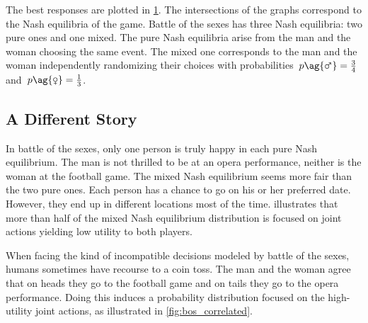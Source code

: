 The best responses are plotted in \cref{fig:bos_best_response}.
The intersections of the graphs correspond to the Nash equilibria of the game.
Battle of the sexes has three Nash equilibria: two pure ones and one mixed.
The pure Nash equilibria arise from the man and the woman choosing the same event.
The mixed one corresponds to the man and the woman independently randomizing their choices with probabilities~\(p\ag{\male} = \frac{3}{4}\) and~\(p\ag{\female} = \frac{1}{3}\).

\begin{figure}[ht]
\centering
{}
\label{fig:bos_best_response}
\end{figure}

\subsection{A Different Story}
\label{sec:different_story}

In battle of the sexes, only one person is truly happy in each pure Nash equilibrium.
The man is not thrilled to be at an opera performance, neither is the woman at the football game.
The mixed Nash equilibrium seems more fair than the two pure ones.
Each person has a chance to go on his or her preferred date.
However, they end up in different locations most of the time.
 illustrates that more than half of the mixed Nash equilibrium distribution is focused on joint actions yielding low utility to both players.

\begin{figure}[htp]
\centering
{}
\label{fig:bos_mixed_nash}
\end{figure}

When facing the kind of incompatible decisions modeled by battle of the sexes, humans sometimes have recourse to a coin toss.
The man and the woman agree that on heads they go to the football game and on tails they go to the opera performance.
Doing this induces a probability distribution focused on the high-utility joint actions, as illustrated in \cref{fig:bos_correlated}.

